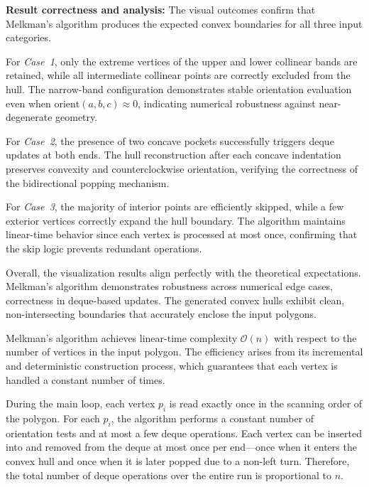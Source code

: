 \documentclass{article}
\begin{document}
\textbf{Result correctness and analysis:}  
The visual outcomes confirm that Melkman’s algorithm produces the expected convex boundaries for all three input categories.

For \emph{Case~1}, only the extreme vertices of the upper and lower collinear bands are retained, while all intermediate collinear points are correctly excluded from the hull. 
The narrow-band configuration demonstrates stable orientation evaluation even when $\text{orient}(a,b,c) \approx 0$, indicating numerical robustness against near-degenerate geometry.

For \emph{Case~2}, the presence of two concave pockets successfully triggers deque updates at both ends. 
The hull reconstruction after each concave indentation preserves convexity and counterclockwise orientation, verifying the correctness of the bidirectional popping mechanism.

For \emph{Case~3}, the majority of interior points are efficiently skipped, while a few exterior vertices correctly expand the hull boundary. 
The algorithm maintains linear-time behavior since each vertex is processed at most once, confirming that the skip logic prevents redundant operations.

Overall, the visualization results align perfectly with the theoretical expectations. 
Melkman’s algorithm demonstrates robustness across numerical edge cases, correctness in deque-based updates. 
The generated convex hulls exhibit clean, non-intersecting boundaries that accurately enclose the input polygons.



Melkman’s algorithm achieves linear-time complexity $\mathcal{O}(n)$ with respect to the number of vertices in the input polygon. 
The efficiency arises from its incremental and deterministic construction process, which guarantees that each vertex is handled a constant number of times. 

During the main loop, each vertex $p_i$ is read exactly once in the scanning order of the polygon. 
For each $p_i$, the algorithm performs a constant number of orientation tests and at most a few deque operations. 
Each vertex can be inserted into and removed from the deque at most once per end—once when it enters the convex hull and once when it is later popped due to a non-left turn. 
Therefore, the total number of deque operations over the entire run is proportional to $n$.
\end{document}

